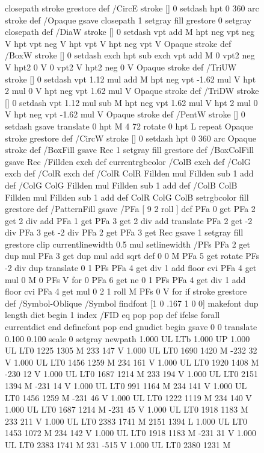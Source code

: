 \documentclass{LMCS}
\begin{document}
\begin{figure}[!tbp]
\begin{minipage}[b]{.45\linewidth}
{{{{  closepath stroke grestore } def
/CircE { stroke [] 0 setdash 
  hpt 0 360 arc stroke } def
/Opaque { gsave closepath 1 setgray fill grestore 0 setgray closepath } def
/DiaW { stroke [] 0 setdash vpt add M
  hpt neg vpt neg V hpt vpt neg V
  hpt vpt V hpt neg vpt V Opaque stroke } def
/BoxW { stroke [] 0 setdash exch hpt sub exch vpt add M
  0 vpt2 neg V hpt2 0 V 0 vpt2 V
  hpt2 neg 0 V Opaque stroke } def
/TriUW { stroke [] 0 setdash vpt 1.12 mul add M
  hpt neg vpt -1.62 mul V
  hpt 2 mul 0 V
  hpt neg vpt 1.62 mul V Opaque stroke } def
/TriDW { stroke [] 0 setdash vpt 1.12 mul sub M
  hpt neg vpt 1.62 mul V
  hpt 2 mul 0 V
  hpt neg vpt -1.62 mul V Opaque stroke } def
/PentW { stroke [] 0 setdash gsave
  translate 0 hpt M 4 {72 rotate 0 hpt L} repeat
  Opaque stroke grestore } def
/CircW { stroke [] 0 setdash 
  hpt 0 360 arc Opaque stroke } def
/BoxFill { gsave Rec 1 setgray fill grestore } def
/BoxColFill {
  gsave Rec
  /Fillden exch def
  currentrgbcolor
  /ColB exch def /ColG exch def /ColR exch def
  /ColR ColR Fillden mul Fillden sub 1 add def
  /ColG ColG Fillden mul Fillden sub 1 add def
  /ColB ColB Fillden mul Fillden sub 1 add def
  ColR ColG ColB setrgbcolor
  fill grestore } def
/PatternFill { gsave /PFa [ 9 2 roll ] def
    PFa 0 get PFa 2 get 2 div add PFa 1 get PFa 3 get 2 div add translate
    PFa 2 get -2 div PFa 3 get -2 div PFa 2 get PFa 3 get Rec
    gsave 1 setgray fill grestore clip
    currentlinewidth 0.5 mul setlinewidth
    /PFs PFa 2 get dup mul PFa 3 get dup mul add sqrt def
    0 0 M PFa 5 get rotate PFs -2 div dup translate
	0 1 PFs PFa 4 get div 1 add floor cvi
	{ PFa 4 get mul 0 M 0 PFs V } for
    0 PFa 6 get ne {
	0 1 PFs PFa 4 get div 1 add floor cvi
	{ PFa 4 get mul 0 2 1 roll M PFs 0 V } for
    } if
    stroke grestore } def
/Symbol-Oblique /Symbol findfont [1 0 .167 1 0 0] makefont
dup length dict begin {1 index /FID eq {pop pop} {def} ifelse} forall
currentdict end definefont pop
end
gnudict begin
gsave
0 0 translate
0.100 0.100 scale
0 setgray
newpath
1.000 UL
LTb
1.000 UP
1.000 UL
LT0
1225 1305 M
233 147 V
1.000 UL
LT0
1690 1420 M
-232 32 V
1.000 UL
LT0
1456 1259 M
234 161 V
1.000 UL
LT0
1920 1408 M
-230 12 V
1.000 UL
LT0
1687 1214 M
233 194 V
1.000 UL
LT0
2151 1394 M
-231 14 V
1.000 UL
LT0
991 1164 M
234 141 V
1.000 UL
LT0
1456 1259 M
-231 46 V
1.000 UL
LT0
1222 1119 M
234 140 V
1.000 UL
LT0
1687 1214 M
-231 45 V
1.000 UL
LT0
1918 1183 M
233 211 V
1.000 UL
LT0
2383 1741 M
2151 1394 L
1.000 UL
LT0
1453 1072 M
234 142 V
1.000 UL
LT0
1918 1183 M
-231 31 V
1.000 UL
LT0
2383 1741 M
231 -515 V
1.000 UL
LT0
2380 1231 M
}}}
\end{minipage}
\end{figure}
\end{document}
